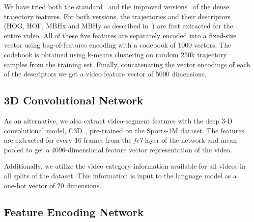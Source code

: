 We have tried both the standard~\cite{DBLP:conf/cvpr/WangKSL11} and
the improved versions~\cite{Wang2013} of the dense trajectory
features.
For both versions, the trajectories and their descriptors (HOG, HOF,
MBHx and MBHy as described in~\cite{DBLP:conf/cvpr/WangKSL11}) are
first extracted for the entire video.
All of these five features are separately encoded into a fixed-size
vector using bag-of-features encoding with a codebook of 1000 vectors.
The codebook is obtained using k-means clustering on random 250k
trajectory samples from the training set.
Finally, concatenating the vector encodings of each of the descriptors
we get a video feature vector of 5000 dimensions. 

\subsection{3D Convolutional Network}
As an alternative, we also extract video-segment features with the
deep 3-D convolutional model, C3D~\cite{DBLP:C3D}, pre-trained on the
Sports-1M dataset.
The features are extracted for every 16 frames from the \emph{fc7}
layer of the network and mean pooled to get a 4096-dimensional feature
vector representation of the video.

Additionally, we utilize the video category information available for
all videos in all splits of the dataset.
This information is input to the language model as a one-hot vector of
20 dimensions.
\subsection{Feature Encoding Network}



